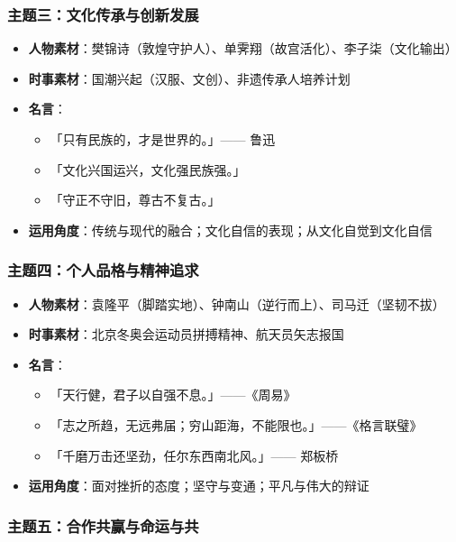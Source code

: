 \subsubsection{主题三：文化传承与创新发展}

\begin{itemize}
  \item \textbf{人物素材}：樊锦诗（敦煌守护人）、单霁翔（故宫活化）、李子柒（文化输出）
  \item \textbf{时事素材}：国潮兴起（汉服、文创）、非遗传承人培养计划
  \item \textbf{名言}：
    \begin{itemize}
      \item 「只有民族的，才是世界的。」—— 鲁迅
      \item 「文化兴国运兴，文化强民族强。」
      \item 「守正不守旧，尊古不复古。」
    \end{itemize}
  \item \textbf{运用角度}：传统与现代的融合；文化自信的表现；从文化自觉到文化自信
\end{itemize}

\subsubsection{主题四：个人品格与精神追求}

\begin{itemize}
  \item \textbf{人物素材}：袁隆平（脚踏实地）、钟南山（逆行而上）、司马迁（坚韧不拔）
  \item \textbf{时事素材}：北京冬奥会运动员拼搏精神、航天员矢志报国
  \item \textbf{名言}：
    \begin{itemize}
      \item 「天行健，君子以自强不息。」——《周易》
      \item 「志之所趋，无远弗届；穷山距海，不能限也。」——《格言联璧》
      \item 「千磨万击还坚劲，任尔东西南北风。」—— 郑板桥
    \end{itemize}
  \item \textbf{运用角度}：面对挫折的态度；坚守与变通；平凡与伟大的辩证
\end{itemize}

\subsubsection{主题五：合作共赢与命运与共}

